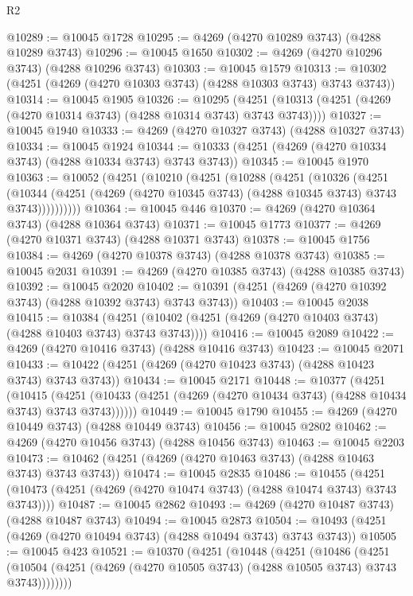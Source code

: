 \begin{lexlean}{R2}
\begin{coremodule}
@10289 := @10045 @1728
@10295 := @4269 (@4270 @10289 @3743) (@4288 @10289 @3743)
@10296 := @10045 @1650
@10302 := @4269 (@4270 @10296 @3743) (@4288 @10296 @3743)
@10303 := @10045 @1579
@10313 := @10302 (@4251 (@4269 (@4270 @10303 @3743) (@4288 @10303 @3743) @3743 @3743))
@10314 := @10045 @1905
@10326 := @10295
    (@4251 (@10313 (@4251 (@4269 (@4270 @10314 @3743) (@4288 @10314 @3743) @3743 @3743))))
@10327 := @10045 @1940
@10333 := @4269 (@4270 @10327 @3743) (@4288 @10327 @3743)
@10334 := @10045 @1924
@10344 := @10333 (@4251 (@4269 (@4270 @10334 @3743) (@4288 @10334 @3743) @3743 @3743))
@10345 := @10045 @1970
@10363 := @10052
    (@4251
      (@10210
        (@4251
          (@10288
            (@4251
              (@10326
                (@4251
                  (@10344
                    (@4251 (@4269 (@4270 @10345 @3743) (@4288 @10345 @3743) @3743 @3743))))))))))
@10364 := @10045 @446
@10370 := @4269 (@4270 @10364 @3743) (@4288 @10364 @3743)
@10371 := @10045 @1773
@10377 := @4269 (@4270 @10371 @3743) (@4288 @10371 @3743)
@10378 := @10045 @1756
@10384 := @4269 (@4270 @10378 @3743) (@4288 @10378 @3743)
@10385 := @10045 @2031
@10391 := @4269 (@4270 @10385 @3743) (@4288 @10385 @3743)
@10392 := @10045 @2020
@10402 := @10391 (@4251 (@4269 (@4270 @10392 @3743) (@4288 @10392 @3743) @3743 @3743))
@10403 := @10045 @2038
@10415 := @10384
    (@4251 (@10402 (@4251 (@4269 (@4270 @10403 @3743) (@4288 @10403 @3743) @3743 @3743))))
@10416 := @10045 @2089
@10422 := @4269 (@4270 @10416 @3743) (@4288 @10416 @3743)
@10423 := @10045 @2071
@10433 := @10422 (@4251 (@4269 (@4270 @10423 @3743) (@4288 @10423 @3743) @3743 @3743))
@10434 := @10045 @2171
@10448 := @10377
    (@4251
      (@10415
        (@4251 (@10433 (@4251 (@4269 (@4270 @10434 @3743) (@4288 @10434 @3743) @3743 @3743))))))
@10449 := @10045 @1790
@10455 := @4269 (@4270 @10449 @3743) (@4288 @10449 @3743)
@10456 := @10045 @2802
@10462 := @4269 (@4270 @10456 @3743) (@4288 @10456 @3743)
@10463 := @10045 @2203
@10473 := @10462 (@4251 (@4269 (@4270 @10463 @3743) (@4288 @10463 @3743) @3743 @3743))
@10474 := @10045 @2835
@10486 := @10455
    (@4251 (@10473 (@4251 (@4269 (@4270 @10474 @3743) (@4288 @10474 @3743) @3743 @3743))))
@10487 := @10045 @2862
@10493 := @4269 (@4270 @10487 @3743) (@4288 @10487 @3743)
@10494 := @10045 @2873
@10504 := @10493 (@4251 (@4269 (@4270 @10494 @3743) (@4288 @10494 @3743) @3743 @3743))
@10505 := @10045 @423
@10521 := @10370
    (@4251
      (@10448
        (@4251
          (@10486
            (@4251
              (@10504 (@4251 (@4269 (@4270 @10505 @3743) (@4288 @10505 @3743) @3743 @3743))))))))

\end{coremodule}
\end{lexlean}
